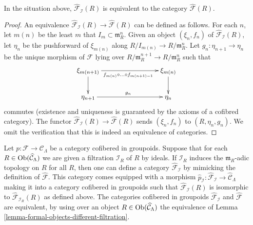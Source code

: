 \begin{lemma}
\label{lemma-formal-objects-different-filtration}
In the situation above, $\widehat{\mathcal{F}}_\mathcal{I}(R)$ is equivalent
to the category $\widehat{\mathcal{F}}(R)$.
\end{lemma}

\begin{proof}
An equivalence
$\widehat{\mathcal{F}}_\mathcal{I}(R) \to \widehat{\mathcal{F}}(R)$
can be defined as follows.  For each $n$, let $m(n)$ be the least $m$
that $I_m \subset \mathfrak m_R^n$.  Given an object
$(\xi_n, f_n)$ of $\widehat{\mathcal{F}}_\mathcal{I}(R)$, let
$\eta_n$ be the pushforward of $\xi_{m(n)}$ along
$R/I_{m(n)} \to R/\mathfrak m_R^n$. Let $g_n : \eta_{n + 1} \to \eta_n$
be the unique morphism of $\mathcal{F}$ lying over
$R/\mathfrak m_R^{n + 1} \to R/\mathfrak m_R^n$ such that
$$
\xymatrix{
\xi_{m(n + 1)} \ar[rrr]_{f_{m(n)} \circ \ldots \circ f_{m(n + 1) - 1}} \ar[d]
& & & \xi_{m(n)} \ar[d] \\
\eta_{n + 1} \ar[rrr]^{g_n} & & & \eta_n
}
$$
commutes (existence and uniqueness is guaranteed by the axioms of a
cofibred category). The functor
$\widehat{\mathcal{F}}_\mathcal{I}(R) \to \widehat{\mathcal{F}}(R)$
sends $(\xi_n, f_n)$ to $(R, \eta_n, g_n)$. We omit the
verification that this is indeed an equivalence of categories.
\end{proof}

\begin{remark}
\label{remark-different-sequence-ideals}
Let $p : \mathcal{F} \to \mathcal{C}_\Lambda$ be a category cofibered in
groupoids. Suppose that for each
$R \in \mathop{\mathrm{Ob}}\nolimits(\widehat{\mathcal{C}}_\Lambda)$ we are given a filtration
$\mathcal{I}_R$ of $R$ by ideals. If
$\mathcal{I}_R$ induces the $\mathfrak m_R$-adic topology on $R$ for all $R$,
then one can define a category
$\widehat{\mathcal{F}}_\mathcal{I}$ by mimicking
the definition of $\widehat{\mathcal{F}}$. This category comes equipped with a
morphism
$\widehat{p}_\mathcal{I} : \widehat{\mathcal{F}}_\mathcal{I} \to
\widehat{\mathcal{C}}_\Lambda$ making it into a category cofibered in
groupoids such that $\widehat{\mathcal{F}}_\mathcal{I}(R)$ is isomorphic to
$\widehat{\mathcal{F}}_{\mathcal{I}_R}(R)$ as defined above. The categories
cofibered in groupoids $\widehat{\mathcal{F}}_\mathcal{I}$ and
$\widehat{\mathcal{F}}$ are equivalent, by using over an object
$R \in \mathop{\mathrm{Ob}}\nolimits(\widehat{\mathcal{C}}_\Lambda)$
the equivalence of
Lemma \ref{lemma-formal-objects-different-filtration}.
\end{remark}


